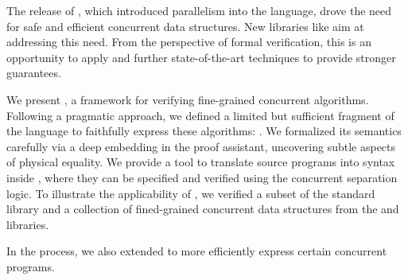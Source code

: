 The release of \OCamlFive, which introduced parallelism into the language, drove the need for safe and efficient concurrent data structures.
New libraries like \Saturn aim at addressing this need.
From the perspective of formal verification, this is an opportunity to apply and further state-of-the-art techniques to provide stronger guarantees.

We present \Zoo, a framework for verifying fine-grained concurrent \OCamlFive algorithms.
Following a pragmatic approach, we defined a limited but sufficient fragment of the language to faithfully express these algorithms: \ZooLang.
We formalized its semantics carefully via a deep embedding in the \Rocq proof assistant, uncovering subtle aspects of physical equality.
We provide a tool to translate source \OCaml programs into \ZooLang syntax inside \Rocq, where they can be specified and verified using the \Iris concurrent separation logic.
To illustrate the applicability of \Zoo, we verified a subset of the standard library and a collection of fined-grained concurrent data structures from the \Saturn and \Eio libraries.

In the process, we also extended \OCaml to more efficiently express certain concurrent programs.
